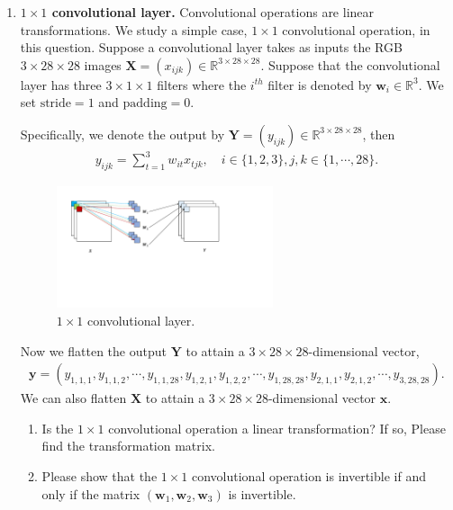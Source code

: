 \documentclass[11pt,letter,notitlepage]{article}
\begin{document}
\begin{exercise}
\begin{enumerate}
\item \textbf{$1\times1$ convolutional layer.} Convolutional operations are linear transformations. We study a simple case, $1\times1$ convolutional operation, in this question. Suppose a convolutional layer takes as inputs the RGB $3\times28\times28$ images $\mathbf{X}=(x_{ijk})\in\mathbb{R}^{3\times28\times28}$. Suppose that the convolutional layer has three $3\times1\times1$ filters where the $i^{th}$ filter is denoted by $\mathbf{w}_{i}\in\mathbb{R}^3$. We set $\text{stride}=1$ and $\text{padding}=0$.

    Specifically, we denote the output by $\mathbf{Y}=(y_{ijk})\in\mathbb{R}^{3\times28\times28}$, then
    \begin{align*}
      y_{ijk}=\sum_{t=1}^3w_{it}x_{tjk}, \quad i\in\{1,2,3\}, j,k\in\{1,\cdots,28\}.
    \end{align*}
    
    \begin{figure}[H]
              \centering
              \includegraphics[width=0.6\textwidth]{Figures/1x1convolution}
              \caption{$1\times1$ convolutional layer.}
            \end{figure}
    
    Now we flatten the output $\mathbf{Y}$ to attain a $3\times28\times28$-dimensional vector,
    \begin{align*}
      \mathbf{y}=(y_{1,1,1},y_{1,1,2},\cdots, y_{1,1,28},y_{1,2,1},y_{1,2,2},
      \cdots,y_{1,28,28},y_{2,1,1},y_{2,1,2},\cdots, y_{3,28,28}).
    \end{align*}
    We can also flatten $\mathbf{X}$ to attain a $3\times28\times28$-dimensional vector $\mathbf{x}$.
    \begin{enumerate}
      \item Is the $1\times1$ convolutional operation a linear transformation? If so, Please find the transformation matrix.
      \item Please show that the $1\times1$ convolutional operation is  invertible if and only if the matrix $(\mathbf{w}_1,\mathbf{w}_2,\mathbf{w}_3)$ is invertible.


\end{enumerate}
\end{enumerate}
\end{exercise}
\end{document}
